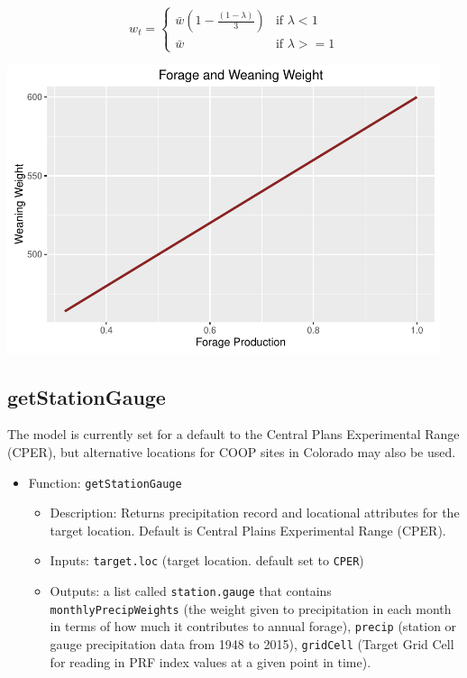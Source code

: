 \documentclass[11pt]{article}
\begin{document}
\begin{equation} \label{calfdroughtweight}
w_{t} = 
\begin{cases}
\bar{w} \left(1 - \frac{(1 - \lambda)}{3}\right) & \text{if } \lambda < 1 \\
\bar{w} & \text{if } \lambda >= 1
\end{cases}
\end{equation}


\includegraphics[width=5in]{weaningweight}



\subsection{getStationGauge}
The model is currently set for a default to the Central Plans Experimental Range (CPER), but alternative locations for COOP sites in Colorado may also be used.

\begin{itemize}
\item Function: \verb!getStationGauge!
	\begin{itemize}
	\item Description: Returns precipitation record and locational attributes for the target
  location. Default is Central Plains Experimental Range (CPER).
  \item Inputs: \verb!target.loc! (target location. default set to \verb!CPER!)
  \item Outputs: a list called \verb!station.gauge! that contains \verb!monthlyPrecipWeights! (the weight given to precipitation in each month in terms of how much it contributes to annual forage), \verb!precip! (station or gauge precipitation data from 1948 to 2015), \verb!gridCell! (Target Grid Cell for reading in PRF index values at a given point in time).
	\end{itemize}
\end{itemize}
\end{document}
